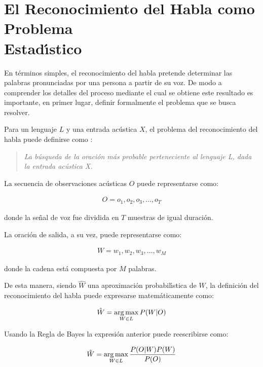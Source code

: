 
\section[El Reconocimiento del Habla como Problema Estad{\'\i}stico]
{El Reconocimiento del Habla como Problema \\ Estad{\'\i}stico}
En t\'erminos simples, el reconocimiento del habla pretende determinar las palabras pronunciadas por una persona
a partir de su voz. De modo a comprender los detalles del proceso mediante el cual se obtiene este
resultado es importante, en primer lugar, definir formalmente el problema que se busca resolver.

Para un lenguaje $L$ y una entrada ac\'ustica $X$, el problema del reconocimiento del habla puede 
definirse como \cite{Jurafsky}:

\begin{quote}
\emph{La b\'usqueda de la oraci\'on m\'as probable perteneciente al lenguaje L, dada la entrada ac\'ustica X.}
\end{quote}

La secuencia de observaciones ac\'usticas $O$ puede representarse como:

\begin{align}
O = o_1,o_2,o_3,\ldots,o_T\label{eq:asrO}
\end{align}

donde la se\~nal de voz fue dividida en $T$ muestras de igual duraci\'on.

La oraci\'on de salida, a su vez, puede representarse como:

\begin{align}
W  = w_1,w_2,w_3,\ldots,w_M\label{eq:asrW}
\end{align}

donde la cadena est\'a compuesta por $M$ palabras.

De esta manera, siendo $\hat{W}$ una aproximaci\'on probabil{\'\i}stica de $W$, la definici\'on del reconocimiento del habla puede expresarse matem\'aticamente como:

\begin{align}
\hat{W} = \operatorname*{arg\,max}_{W \in L} P(W|O)
\end{align}

Usando la Regla de Bayes la expresi\'on anterior puede reescribirse como:

\begin{align}
\hat{W} = \operatorname*{arg\,max}_{W \in L} \frac{P(O|W)P(W)}{P(O)}
\end{align}

